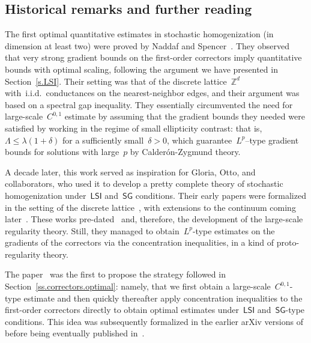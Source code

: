 \documentclass[11pt,twoside]{article} %
\numberwithin{equation}{section}
\theoremstyle{definition}
\newcommand*{\Zd}{\ensuremath{\mathbb{Z}^d}}
\newcommand{\LSI}{\mathsf{LSI}}
\newcommand{\SG}{\mathsf{SG}}
\begin{document}
\subsection*{Historical remarks and further reading}


The first optimal quantitative estimates in stochastic homogenization (in dimension at least two) were proved by Naddaf and Spencer~\cite{NS2}.
They observed that very strong gradient bounds on the first-order correctors imply quantitative bounds with optimal scaling, following the argument we have presented in Section~\ref{s.LSI}. Their setting was that of the discrete lattice~$\Zd$ with~i.i.d.~conductances on the nearest-neighbor edges, and their argument was based on a spectral gap inequality. They essentially circumvented the need for large-scale~$C^{0,1}$ estimate by assuming that the gradient bounds they needed were satisfied by working in the regime of small ellipticity contrast: that is,~$\Lambda\leq \lambda (1+\delta)$ for a sufficiently small~$\delta>0$, which guarantee~$L^p$--type gradient bounds for solutions with large~$p$ by Calder\'on-Zygmund theory. 

\smallskip

A decade later, this work served as inspiration for Gloria, Otto, and collaborators, who used it to develop a pretty complete theory of stochastic homogenization under~$\LSI$ and~$\SG$ conditions. Their early papers were formalized in the setting of the discrete lattice~\cite{GO1,GO2,GNO,MO}, with extensions to the continuum coming later~\cite{GO3}. These works pre-dated~\cite{AS} and, therefore, the development of the large-scale regularity theory. Still, they managed to obtain~$L^p$-type estimates on the gradients of the correctors via the concentration inequalities, in a kind of proto-regularity theory.  

\smallskip

The paper~\cite{AS} was the first to propose the strategy followed in Section~\ref{ss.correctors.optimal}: namely, that we first obtain a large-scale~$C^{0,1}$-type estimate and then quickly thereafter apply concentration inequalities to the first-order correctors directly to obtain optimal estimates under~$\LSI$ and~$\SG$-type conditions. This idea was subsequently formalized in the earlier arXiv versions of~\cite{GNO3} before being eventually published in~\cite{GNO4}. 

\smallskip
\end{document}
